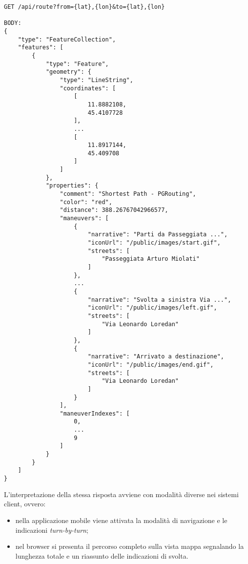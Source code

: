 \begin{lstlisting}[caption=Invocazione API di routing,label=response-routing]
GET /api/route?from={lat},{lon}&to={lat},{lon}

BODY: 
{
    "type": "FeatureCollection",
    "features": [
        {
            "type": "Feature",
            "geometry": {
                "type": "LineString",
                "coordinates": [
                    [
                        11.8882108,
                        45.4107728
                    ],
                    ...
                    [
                        11.8917144,
                        45.409708
                    ]
                ]
            },
            "properties": {
                "comment": "Shortest Path - PGRouting",
                "color": "red",
                "distance": 388.26767042966577,
                "maneuvers": [
                    {
                        "narrative": "Parti da Passeggiata ...",
                        "iconUrl": "/public/images/start.gif",
                        "streets": [
                            "Passeggiata Arturo Miolati"
                        ]
                    },                  
                    ...
                    {
                        "narrative": "Svolta a sinistra Via ...",
                        "iconUrl": "/public/images/left.gif",
                        "streets": [
                            "Via Leonardo Loredan"
                        ]
                    },
                    {
                        "narrative": "Arrivato a destinazione",
                        "iconUrl": "/public/images/end.gif",
                        "streets": [
                            "Via Leonardo Loredan"
                        ]
                    }
                ],
                "maneuverIndexes": [
                    0,             
                    ...
                    9
                ]
            }
        }
    ]
}
\end{lstlisting}

L'interpretazione della stessa risposta avviene con modalità diverse nei sistemi client, ovvero:
\begin{itemize}
\item nella applicazione mobile viene attivata la modalità di navigazione e le indicazioni \emph{turn-by-turn};
\item nel browser si presenta il percorso completo sulla vista mappa segnalando la lunghezza totale e un riassunto delle indicazioni di svolta.
\end{itemize}

